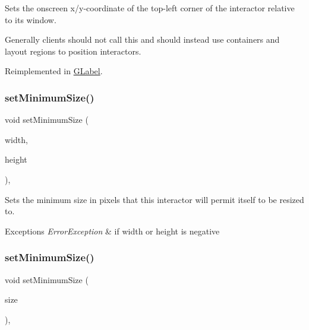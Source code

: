 Sets the onscreen x/y-\/coordinate of the top-\/left corner of the interactor relative to its window. 

Generally clients should not call this and should instead use containers and layout regions to position interactors. 

Reimplemented in \mbox{\hyperlink{classsgl_1_1GLabel_ae3b17c0aeb355dc23c4e4cbf066e81f7}{G\+Label}}.

\mbox{\label{classsgl_1_1GInteractor_a0cf428e207b7f22cc08138a90b1b87b2}} 
\subsubsection{\texorpdfstring{set\+Minimum\+Size()}{setMinimumSize()}\hspace{0.1cm}{\footnotesize\ttfamily [1/2]}}
{\footnotesize\ttfamily void set\+Minimum\+Size (\begin{DoxyParamCaption}\item[{double}]{width,  }\item[{double}]{height }\end{DoxyParamCaption})\hspace{0.3cm}{\ttfamily [virtual]}, {\ttfamily [inherited]}}



Sets the minimum size in pixels that this interactor will permit itself to be resized to. 


\begin{DoxyExceptions}{Exceptions}
{\em Error\+Exception} & if width or height is negative \\
\hline
\end{DoxyExceptions}
\mbox{\label{classsgl_1_1GInteractor_a3b1046117ac6cb7abe467e00ba8a81f4}} 
\subsubsection{\texorpdfstring{set\+Minimum\+Size()}{setMinimumSize()}\hspace{0.1cm}{\footnotesize\ttfamily [2/2]}}
{\footnotesize\ttfamily void set\+Minimum\+Size (\begin{DoxyParamCaption}\item[{const \mbox{\hyperlink{structsgl_1_1GDimension}{G\+Dimension}} \&}]{size }\end{DoxyParamCaption})\hspace{0.3cm}{\ttfamily [virtual]}, {\ttfamily [inherited]}}



